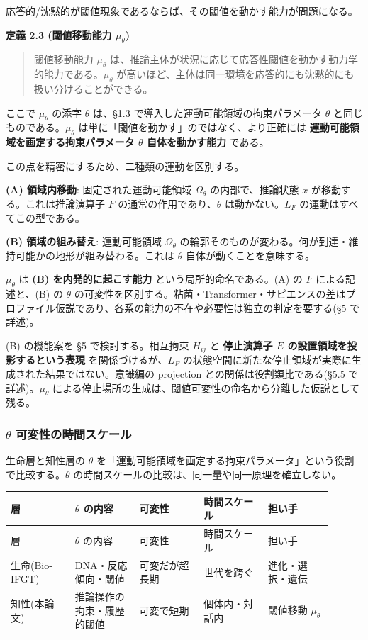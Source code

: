 応答的/沈黙的が閾値現象であるならば、その閾値を動かす能力が問題になる。

\textbf{定義 2.3 (閾値移動能力 $\mu_\theta$)}

\begin{quote}
閾値移動能力 $\mu_\theta$ は、推論主体が状況に応じて応答性閾値を動かす動力学的能力である。$\mu_\theta$ が高いほど、主体は同一環境を応答的にも沈黙的にも扱い分けることができる。
\end{quote}


ここで $\mu_\theta$ の添字 $\theta$ は、\S{}1.3 で導入した運動可能領域の拘束パラメータ $\theta$ と同じものである。$\mu_\theta$ は単に「閾値を動かす」のではなく、より正確には \textbf{運動可能領域を画定する拘束パラメータ $\theta$ 自体を動かす能力} である。

この点を精密にするため、二種類の運動を区別する。

\textbf{(A) 領域内移動}:
固定された運動可能領域 $\Omega_\theta$ の内部で、推論状態 $x$ が移動する。これは推論演算子 $F$ の通常の作用であり、$\theta$ は動かない。$L_F$ の運動はすべてこの型である。

\textbf{(B) 領域の組み替え}:
運動可能領域 $\Omega_\theta$ の輪郭そのものが変わる。何が到達・維持可能かの地形が組み替わる。これは $\theta$ 自体が動くことを意味する。

$\mu_\theta$ は \textbf{(B) を内発的に起こす能力} という局所的命名である。(A) の $F$ による記述と、(B) の $\theta$ の可変性を区別する。粘菌・Transformer・サピエンスの差はプロファイル仮説であり、各系の能力の不在や必要性は独立の判定を要する(\S{}5 で詳述)。

(B) の機能案を \S{}5 で検討する。相互拘束 $H_{ij}$ と \textbf{停止演算子 $E$ の設置領域を投影するという表現} を関係づけるが、$L_F$ の状態空間に新たな停止領域が実際に生成された結果ではない。意識編の projection との関係は役割類比である(\S{}5.5 で詳述)。$\mu_\theta$ による停止場所の生成は、閾値可変性の命名から分離した仮説として残る。

\subsubsection{$\theta$ 可変性の時間スケール}


生命層と知性層の $\theta$ を「運動可能領域を画定する拘束パラメータ」という役割で比較する。$\theta$ の時間スケールの比較は、同一量や同一原理を確立しない。

\begin{longtable}{@{}p{0.18\linewidth}p{0.18\linewidth}p{0.18\linewidth}p{0.18\linewidth}p{0.18\linewidth}@{}}
\toprule
層 & $\theta$ の内容 & 可変性 & 時間スケール & 担い手 \\
\midrule
\endfirsthead
\toprule
層 & $\theta$ の内容 & 可変性 & 時間スケール & 担い手 \\
\midrule
\endhead
生命(Bio-IFGT) & DNA・反応傾向・閾値 & 可変だが超長期 & 世代を跨ぐ & 進化・選択・遺伝 \\
知性(本論文) & 推論操作の拘束・履歴的閾値 & 可変で短期 & 個体内・対話内 & 閾値移動 $\mu_\theta$ \\
\bottomrule
\end{longtable}


